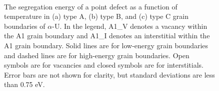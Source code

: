 \documentclass[review]{elsarticle}
\begin{document}
\begin{figure}[h!]
\centering
{}
\\
\caption{The segregation energy of a point defect as a function of temperature in (a) type A, (b) type B, and (c) type C grain boundaries of $\alpha$-U. In the legend, A1\_V denotes a vacancy within the A1 grain boundary and A1\_I denotes an interstitial within the A1 grain boundary. Solid lines are for low-energy grain boundaries and dashed lines are for high-energy grain boundaries. Open symbols are for vacancies and closed symbols are for interstitials. Error bars are not shown for clarity, but standard deviations are less than 0.75 eV.}
\label{fig:Seg}
\end{figure}
\end{document}
